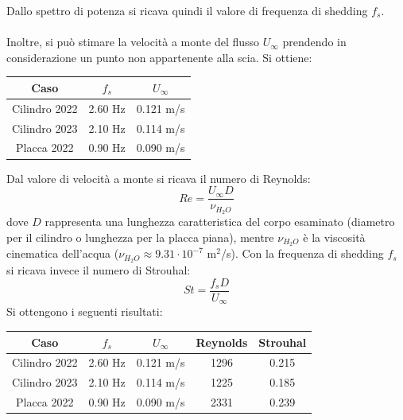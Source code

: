\noindent Dallo spettro di potenza si ricava quindi il valore di frequenza di shedding $f_s$.\\\\
Inoltre, si può stimare la velocità a monte del flusso $U_\infty$ prendendo in considerazione un punto non appartenente alla scia. Si ottiene:
\begin{table}[H]
    \centering
    \begin{tabular}{|c|c|c|}
    \hline
    Caso          & $f_s$   & $U_\infty$ \\ \hline
    Cilindro 2022 & 2.60 Hz & 0.121 m/s  \\ \hline
    Cilindro 2023 & 2.10 Hz & 0.114 m/s  \\ \hline
    Placca 2022   & 0.90 Hz & 0.090 m/s  \\ \hline
    \end{tabular}
\end{table}

\noindent Dal valore di velocità a monte si ricava il numero di Reynolds:
\begin{equation*}
    Re = \frac{U_\infty D}{\nu_{H_2O} }
\end{equation*}
dove $D$ rappresenta una lunghezza caratteristica del corpo esaminato (diametro per il cilindro o lunghezza per la placca piana), mentre $\nu_{H_2O}$ è la viscosità cinematica dell'acqua ($\nu_{H_2O}\approx 9.31\cdot10^{-7}$ m$^2$/s). Con la frequenza di shedding $f_s$ si ricava invece il numero di Strouhal:
\begin{equation*}
    St = \frac{f_s D}{U_\infty}
\end{equation*}
Si ottengono i seguenti risultati:
\begin{table}[H]
    \centering
    \begin{tabular}{|c|c|c|c|c|}
    \hline
    Caso          & $f_s$   & $U_\infty$ & Reynolds & Strouhal \\ \hline
    Cilindro 2022 & 2.60 Hz & 0.121 m/s  & 1296     & 0.215    \\ \hline
    Cilindro 2023 & 2.10 Hz & 0.114 m/s  & 1225     & 0.185    \\ \hline
    Placca 2022   & 0.90 Hz & 0.090 m/s  & 2331     & 0.239    \\ \hline
    \end{tabular}
\end{table}

